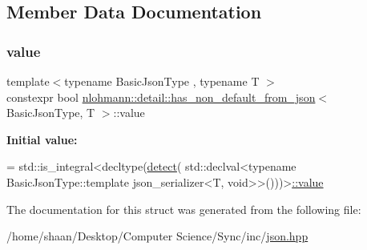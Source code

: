 \subsection{Member Data Documentation}
\mbox{\label{structnlohmann_1_1detail_1_1has__non__default__from__json_ad34bb7cd3961fcafc2c5047a9782e931}} 
\subsubsection{\texorpdfstring{value}{value}}
{\footnotesize\ttfamily template$<$typename Basic\+Json\+Type , typename T $>$ \\
constexpr bool \hyperlink{structnlohmann_1_1detail_1_1has__non__default__from__json}{nlohmann\+::detail\+::has\+\_\+non\+\_\+default\+\_\+from\+\_\+json}$<$ Basic\+Json\+Type, T $>$\+::value\hspace{0.3cm}{\ttfamily [static]}}

{\bfseries Initial value\+:}
\begin{DoxyCode}
= std::is\_integral<decltype(\hyperlink{structnlohmann_1_1detail_1_1has__non__default__from__json_a87428058d4e01d8f034ec5b2574795a3}{detect}(
                                      std::declval<\textcolor{keyword}{typename} BasicJsonType::template json\_serializer<T,
       void>>()))>\hyperlink{structnlohmann_1_1detail_1_1has__non__default__from__json_ad34bb7cd3961fcafc2c5047a9782e931}{::value}
\end{DoxyCode}


The documentation for this struct was generated from the following file\+:\begin{DoxyCompactItemize}
\item 
/home/shaan/\+Desktop/\+Computer Science/\+Sync/inc/\hyperlink{json_8hpp}{json.\+hpp}\end{DoxyCompactItemize}
